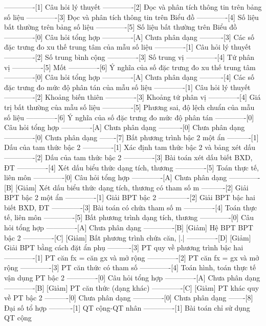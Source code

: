 -------------[1] Câu hỏi lý thuyết
-------------[2] Đọc và phân tích thông tin trên bảng số liệu
-------------[3] Đọc và phân tích thông tin trên Biểu đồ
-------------[4] Số liệu bất thường trên bảng số liệu
-------------[5] Số liệu bất thường trên Biểu đồ
-------------[0] Câu hỏi tổng hợp
-------------[A] Chưa phân dạng
----------[3] Các số đặc trưng đo xu thế trung tâm của mẫu số liệu
-------------[1] Câu hỏi lý thuyết
-------------[2] Số trung bình cộng
-------------[3] Số trung vị
-------------[4] Tứ phân vị
-------------[5] Mốt
-------------[6] Ý nghĩa của số đặc trưng đo xu thế trung tâm
-------------[0] Câu hỏi tổng hợp
-------------[A] Chưa phân dạng
----------[4] Các số đặc trưng đo mức độ phân tán của mẫu số liệu
-------------[1] Câu hỏi lý thuyết
-------------[2] Khoảng biến thiên
-------------[3] Khoảng tứ phân vị
-------------[4] Giá trị bất thường của mẫu số liệu
-------------[5] Phương sai, độ lệch chuẩn của mẫu số liệu
-------------[6] Ý nghĩa của số đặc trưng đo mức độ phân tán
-------------[0] Câu hỏi tổng hợp
-------------[A] Chưa phân dạng
----------[0] Chưa phân dạng
-------------[0] Chưa phân dạng
-------[7] Bất phương trình bậc 2 một ẩn
----------[1] Dấu của tam thức bậc 2
-------------[1] Xác định tam thức bậc 2 và bảng xét dấu
-------------[2] Dấu của tam thức bậc 2
-------------[3] Bài toán xét dấu biết BXD, ĐT
-------------[4] Xét dấu biểu thức dạng tích, thương
-------------[5] Toán thực tế, liên môn
-------------[0] Câu hỏi tổng hợp
-------------[A] Chưa phân dạng
-------------[B] [Giảm] Xét dấu biểu thức dạng tích, thương có tham số m
----------[2] Giải BPT bậc 2 một ẩn
-------------[1] Giải BPT bậc 2
-------------[2] Giải BPT bậc hai biết BXD, ĐT
-------------[3] Bài toán có chứa tham số m
-------------[4] Toán thực tế, liên môn
-------------[5] Bất phương trình dạng tích, thương
-------------[0] Câu hỏi tổng hợp
-------------[A] Chưa phân dạng
-------------[B] [Giảm] Hệ BPT BPT bậc 2
-------------[C] [Giảm] Bất phương trình chứa căn, |.|
-------------[D] [Giảm] Giải BPT bằng cách đặt ẩn phụ
----------[3] PT quy về phương trình bậc hai
-------------[1] PT căn fx = căn gx và mở rộng
-------------[2] PT căn fx = gx và mở rộng
-------------[3] PT căn thức có tham số
-------------[4] Toán hình, toán thực tế vận dụng PT bậc 2
-------------[0] Câu hỏi tổng hợp
-------------[A] Chưa phân dạng
-------------[B] [Giảm] PT căn thức (dạng khác)
-------------[C] [Giảm] PT khác quy về PT bậc 2
----------[0] Chưa phân dạng
-------------[0] Chưa phân dạng
-------[8] Đại số tổ hợp
----------[1] QT cộng-QT nhân
-------------[1] Bài toán chỉ sử dụng QT cộng
